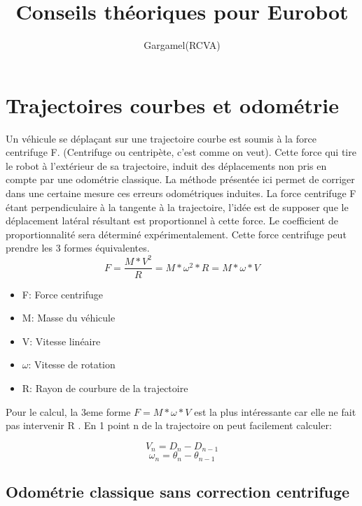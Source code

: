 \documentclass[a4paper]{report}
\author{Gargamel(RCVA)}
\title{Conseils théoriques pour Eurobot}
\begin{document}

\maketitle %
\tableofcontents %

\chapter{Trajectoires courbes et odométrie}
Un véhicule se déplaçant sur une trajectoire courbe est soumis à la force centrifuge F. (Centrifuge ou centripète, c'est comme on veut).
Cette force qui tire le robot à l'extérieur de sa trajectoire, induit des déplacements non pris en compte par une odométrie classique.
La méthode présentée ici permet de corriger dans une certaine mesure ces erreurs odométriques induites.
La force centrifuge F étant perpendiculaire à la tangente à la trajectoire, l'idée est de supposer que le déplacement latéral résultant est proportionnel à cette force. Le coefficient de proportionnalité sera déterminé expérimentalement.
Cette force centrifuge peut prendre les 3 formes équivalentes.
\begin{equation}
F= \frac{M*V^2}{R} = M*\omega^2*R = M*\omega*V
\end{equation}

\begin{itemize}
\item F:  Force centrifuge
\item M: Masse du véhicule
\item V:  Vitesse linéaire
\item $\omega$: Vitesse de rotation
\item R:  Rayon de courbure de la trajectoire
\end{itemize}


Pour le calcul, la 3eme forme $F=M*\omega*V$ est la plus intéressante car elle ne fait pas intervenir R .
En 1 point n de la trajectoire on peut facilement calculer:

\begin{equation}
V_n= D_n - D_{n-1}
\end{equation}
\begin{equation}
\omega_n= \theta_n - \theta_{n-1}
\end{equation}

\section{Odométrie classique sans correction centrifuge}
\end{document}
